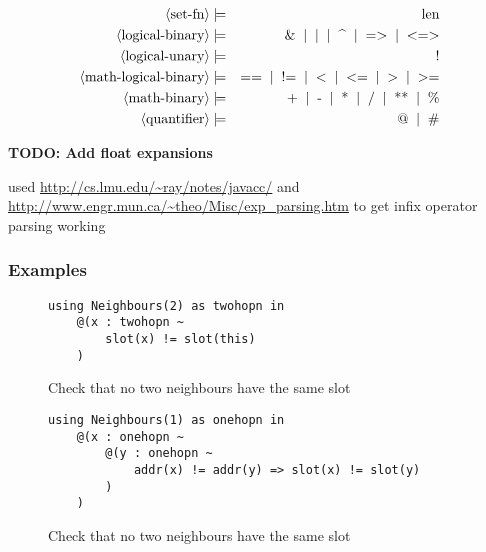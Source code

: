 \begin{eqnarray*}
	\pn{set-fn} & \pp & \sm{len} \\
%
	\pn{logical-binary} & \pp & \sm{\&}  \oo \sm{\textbar} \oo \sm{\textasciicircum} \oo \sm{=\textgreater} \oo \sm{\textless=\textgreater} \\
	\pn{logical-unary} & \pp & \sm{!} \\
	\pn{math-logical-binary} & \pp & \sm{==} \oo \sm{!=} \oo \sm{\textless} \oo \sm{\textless=} \oo \sm{\textgreater} \oo \sm{\textgreater=} \\
	\pn{math-binary} & \pp & \sm{+} \oo \sm{-} \oo \sm{*} \oo \sm{/} \oo \sm{**} \oo \sm{\%} \\
%
%
	\pn{quantifier} & \pp & \sm{@} \oo \sm{\#} \\
\end{eqnarray*}

\textbf{TODO: Add float expansions}

used \url{http://cs.lmu.edu/~ray/notes/javacc/} and \url{http://www.engr.mun.ca/~theo/Misc/exp_parsing.htm} to get infix operator parsing working

\subsubsection{Examples}

\begin{figure}[H]
\begin{verbatim}
using Neighbours(2) as twohopn in
    @(x : twohopn ~
        slot(x) != slot(this)
    )
\end{verbatim}
\caption{Check that no two neighbours have the same slot}
\end{figure}

\begin{figure}[H]
\begin{verbatim}
using Neighbours(1) as onehopn in
    @(x : onehopn ~
        @(y : onehopn ~
            addr(x) != addr(y) => slot(x) != slot(y)
        )
    )
\end{verbatim}
\caption{Check that no two neighbours have the same slot}
\end{figure}

